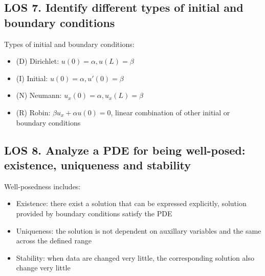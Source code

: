 \documentclass[12pt, a4paper]{article}
\begin{document}
\subsection*{LOS 7. Identify different types of initial and boundary conditions}
Types of initial and boundary conditions:\\
\begin{itemize}
    \item (D) Dirichlet: $u(0) = \alpha, u(L) = \beta$
    \item (I) Initial: $u(0) = \alpha, u'(0) = \beta$
    \item (N) Neumann: $u_{x}(0) = \alpha, u_{x}(L) = \beta$
    \item (R) Robin: $\beta u_{x} + \alpha u(0) = 0$, linear combination of other initial or boundary conditions\\
\end{itemize}
\vspace{0.3em}

\subsection*{LOS 8. Analyze a PDE for being well-posed: existence, uniqueness and stability}
Well-posedness includes:
\begin{itemize}
    \item Existence: there exist a solution that can be expressed explicitly, solution provided by boundary conditions satisfy the PDE
    \item Uniqueness: the solution is not dependent on auxillary variables and the same across the defined range
    \item Stability: when data are changed very little, the corresponding solution also change very little
\end{itemize}
\vspace{1em}
\end{document}

